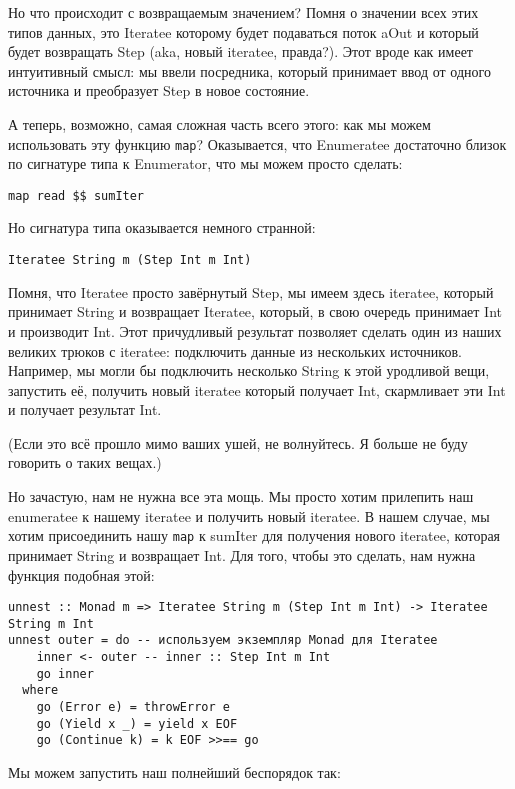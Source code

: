 Но что происходит с возвращаемым значением? Помня о значении всех этих типов данных, это Iteratee которому будет подаваться поток aOut и который будет возвращать Step (aka, новый iteratee, правда?). Этот вроде как имеет интуитивный смысл: мы ввели посредника, который принимает ввод от одного источника и преобразует Step в новое состояние.

А теперь, возможно, самая сложная часть всего этого: как мы можем использовать эту функцию \lstinline'map'? Оказывается, что Enumeratee достаточно близок по сигнатуре типа к Enumerator, что мы можем просто сделать:

\begin{lstlisting}
map read $$ sumIter
\end{lstlisting}

Но сигнатура типа оказывается немного странной:

\begin{lstlisting}
Iteratee String m (Step Int m Int)
\end{lstlisting}

Помня, что Iteratee просто завёрнутый Step, мы имеем здесь iteratee, который принимает String и возвращает Iteratee, который, в свою очередь принимает Int и производит Int. Этот причудливый результат позволяет сделать один из наших великих трюков с iteratee: подключить данные из нескольких источников. Например, мы могли бы подключить несколько String к этой уродливой вещи, запустить её, получить новый iteratee который получает Int, скармливает эти Int и получает результат Int.

(Если это всё прошло мимо ваших ушей, не волнуйтесь. Я больше не буду говорить о таких вещах.)

Но зачастую, нам не нужна все эта мощь. Мы просто хотим прилепить наш enumeratee к нашему iteratee и получить новый iteratee. В нашем случае, мы хотим присоединить нашу \lstinline'map' к sumIter для получения нового iteratee, которая принимает String и возвращает Int. Для того, чтобы это сделать, нам нужна функция подобная этой:

\begin{lstlisting}
unnest :: Monad m => Iteratee String m (Step Int m Int) -> Iteratee String m Int
unnest outer = do -- используем экземпляр Monad для Iteratee
    inner <- outer -- inner :: Step Int m Int
    go inner
  where
    go (Error e) = throwError e
    go (Yield x _) = yield x EOF
    go (Continue k) = k EOF >>== go
\end{lstlisting}

Мы можем запустить наш полнейший беспорядок так:

